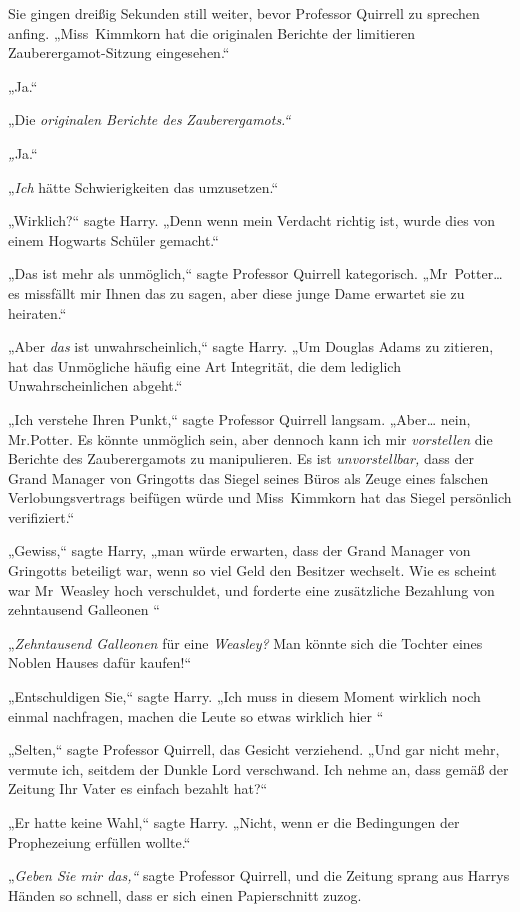 {Sie gingen dreißig Sekunden still weiter, bevor Professor Quirrell zu sprechen anfing. „Miss~Kimmkorn hat die originalen Berichte der limitieren Zauberergamot-Sitzung eingesehen.“

„Ja.“

„Die \emph{originalen Berichte des} \emph{Zauberergamots.“}

\emph{„}Ja.“

„\emph{Ich} hätte Schwierigkeiten das umzusetzen.“

„Wirklich?“ sagte Harry. „Denn wenn mein Verdacht richtig ist, wurde dies von einem Hogwarts Schüler gemacht.“

„Das ist mehr als unmöglich,“ sagte Professor Quirrell kategorisch. „Mr~Potter… es missfällt mir Ihnen das zu sagen, aber diese junge Dame erwartet sie zu heiraten.“

„Aber \emph{das} ist unwahrscheinlich,“ sagte Harry. „Um Douglas Adams zu zitieren, hat das Unmögliche häufig eine Art Integrität, die dem lediglich Unwahrscheinlichen abgeht.“

„Ich verstehe Ihren Punkt,“ sagte Professor Quirrell langsam. „Aber… nein, Mr.Potter. Es könnte unmöglich sein, aber dennoch kann ich mir \emph{vorstellen} die Berichte des Zauberergamots zu manipulieren. Es ist \emph{unvorstellbar,} dass der Grand Manager von Gringotts das Siegel seines Büros als Zeuge eines falschen Verlobungsvertrags beifügen würde und Miss~Kimmkorn hat das Siegel persönlich verifiziert.“

„Gewiss,“ sagte Harry, „man würde erwarten, dass der Grand Manager von Gringotts beteiligt war, wenn so viel Geld den Besitzer wechselt. Wie es scheint war Mr~Weasley hoch verschuldet, und forderte eine zusätzliche Bezahlung von zehntausend Galleonen \later“

„\emph{Zehntausend Galleonen} für eine \emph{Weasley?} Man könnte sich die Tochter eines Noblen Hauses dafür kaufen!“

„Entschuldigen Sie,“ sagte Harry. „Ich muss in diesem Moment wirklich noch einmal nachfragen, machen die Leute so etwas wirklich hier \later“

„Selten,“ sagte Professor Quirrell, das Gesicht verziehend. „Und gar nicht mehr, vermute ich, seitdem der Dunkle Lord verschwand. Ich nehme an, dass gemäß der Zeitung Ihr Vater es einfach bezahlt hat?“

„Er hatte keine Wahl,“ sagte Harry. „Nicht, wenn er die Bedingungen der Prophezeiung erfüllen wollte.“

„\emph{Geben Sie mir das,“} sagte Professor Quirrell, und die Zeitung sprang aus Harrys Händen so schnell, dass er sich einen Papierschnitt zuzog.

}

